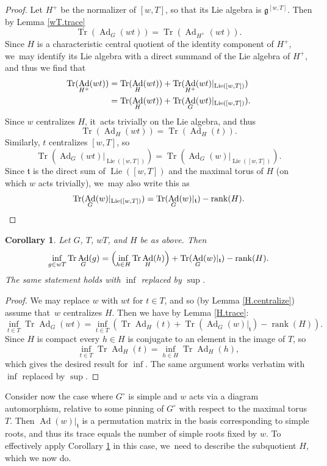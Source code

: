 \documentclass[JEP,XML,SOM,Unicode,NoFloatCountersInSection,published]{cedram}
\newtheorem{cor}[equation]{Corollary}
\theoremstyle{definition}
\let\ic\circ
\newcommand{\mfg}{\mathfrak{g}}
\newcommand{\mft}{\mathfrak{t}}
\DeclareMathOperator{\Tr}{Tr}
\DeclareMathOperator{\Ad}{Ad}
\DeclareMathOperator{\Lie}{Lie}
\DeclareMathOperator{\rank}{rank}
\begin{document}
\begin{proof}
Let $H^+$ be the normalizer of $[w,T]$, so that its Lie algebra is $\mfg^{[w,T]}$. Then by Lemma \ref{wT.trace}
\[
\Tr(\Ad_G(wt)) = \Tr(\Ad_{H^+}(wt)).
\]
Since $H$ is a characteristic central quotient of the identity component of $H^+$, we~may identify its Lie algebra with a direct summand of the Lie algebra of $H^+$, and thus we find that
\begin{align}
\Tr(\Ad_{H^+}(wt))
&=
\Tr(\Ad_H(wt)) + \Tr(\Ad_{H^+}(wt)|_{\Lie([w,T])})\notag\\
&=
\Tr(\Ad_H(wt)) + \Tr(\Ad_G(wt)|_{\Lie([w,T])}).\notag
\end{align}
Since $w$ centralizes $H$, it~acts trivially on the Lie algebra, and thus
\[
\Tr(\Ad_H(wt)) = \Tr(\Ad_H(t)).
\]
Similarly, $t$ centralizes $[w,T]$, so
\[
\Tr(\Ad_G(wt)|_{\Lie([w,T])})
=
\Tr(\Ad_G(w)|_{\Lie([w,T])}).
\]
Since $\mft$ is the direct sum of $\Lie([w,T])$ and the maximal torus of $H$ (on which $w$ acts trivially), we~may also write this as
\[
\Tr(\Ad_G(w)|_{\Lie([w,T])})
=
\Tr(\Ad_G(w)|_\mft) - \rank(H). \qedhere
\]
\end{proof}

\begin{cor}\label{GH.reduction}
Let $G$, $T$, $wT$, and $H$ be as above. Then
\[
\inf_{g\in wT} \Tr\Ad_G(g)
=
\Bigl( \inf_{h\in H} \Tr\Ad_H(h) \Bigr)
+
\Tr(\Ad_G(w)|_{\mft})-\rank(H).
\]
The same statement holds with $\inf$ replaced by $\sup$.
\end{cor}

\begin{proof}
We may replace $w$ with $wt$ for $t \in T$, and so (by Lemma \ref{H.centralize}) assume that~$w$ centralizes $H$. Then we have by Lemma \ref{H.trace}:
\[
\inf_{t\in T} \Tr\Ad_G(wt)
=
\inf_{t\in T} \left(\Tr\Ad_H(t)+ \Tr(\Ad_G(w)|_{\mft})-\rank(H) \right).
\]
Since $H$ is compact every $h \in H$ is conjugate to an element in the image of $T$, so
\[
\inf_{t\in T} \Tr\Ad_H(t) = \inf_{h\in H} \Tr\Ad_H(h),
\]
which gives the desired result for $\inf$. The same argument works verbatim with $\inf$ replaced by $\sup$.
\end{proof}

Consider now the case where $G^\ic$ is simple and $w$ acts via a diagram automorphism, relative to some pinning of $G^\ic$ with respect to the maximal torus $T$. Then $\Ad(w)\vert_{\mft}$ is a
permutation matrix in the basis corresponding to simple roots, and thus its
trace equals the number of simple roots fixed by $w$.
To effectively apply Corollary \ref{GH.reduction} in this case, we~need to describe the subquotient $H$, which we now do.
\end{document}
